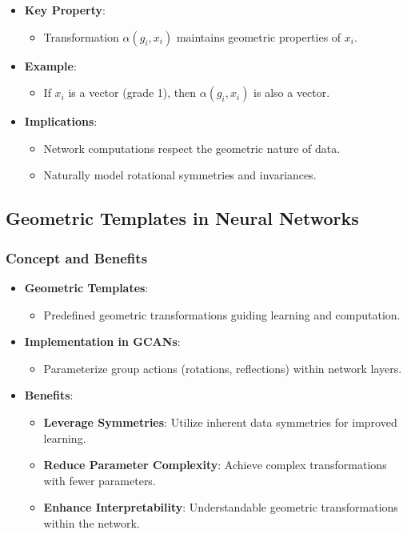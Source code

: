 \documentclass[a4paper,14pt]{article}
\theoremstyle{plain} %
\theoremstyle{definition} %
\theoremstyle{remark} %
\theoremstyle{definition}
\theoremstyle{remark}
\theoremstyle{remark}
\begin{document}
	\begin{itemize}
		\item \textbf{Key Property}:
		\begin{itemize}
			\item Transformation \( \alpha(g_i, x_i) \) maintains geometric properties of \( x_i \).
		\end{itemize}
		\item \textbf{Example}:
		\begin{itemize}
			\item If \( x_i \) is a vector (grade 1), then \( \alpha(g_i, x_i) \) is also a vector.
		\end{itemize}
		\item \textbf{Implications}:
		\begin{itemize}
			\item Network computations respect the geometric nature of data.
			\item Naturally model rotational symmetries and invariances.
		\end{itemize}
	\end{itemize}
	
	\subsection{Geometric Templates in Neural Networks}
	
	\subsubsection{Concept and Benefits}
	
	\begin{itemize}
		\item \textbf{Geometric Templates}:
		\begin{itemize}
			\item Predefined geometric transformations guiding learning and computation.
		\end{itemize}
		\item \textbf{Implementation in GCANs}:
		\begin{itemize}
			\item Parameterize group actions (rotations, reflections) within network layers.
		\end{itemize}
		\item \textbf{Benefits}:
		\begin{itemize}
			\item \textbf{Leverage Symmetries}: Utilize inherent data symmetries for improved learning.
			\item \textbf{Reduce Parameter Complexity}: Achieve complex transformations with fewer parameters.
			\item \textbf{Enhance Interpretability}: Understandable geometric transformations within the network.
		\end{itemize}
	\end{itemize}
	
\end{document}
